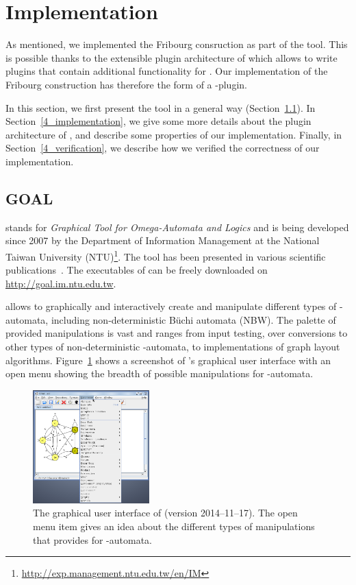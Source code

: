 \section{Implementation}
As mentioned, we implemented the Fribourg consruction as part of the \goal{} tool. This is possible thanks to the extensible plugin architecture of \goal{} which allows to write plugins that contain additional functionality for \goal. Our implementation of the Fribourg construction has therefore the form of a \goal-plugin.

In this section, we first present the \goal{} tool in a general way (Section~\ref{4_goal}). In Section~\ref{4_implementation}, we give some more details about the plugin architecture of \goal, and describe some properties of our implementation. Finally, in Section~\ref{4_verification}, we describe how we verified the correctness of our implementation.


\subsection{GOAL}
\label{4_goal}
\goal{} stands for \textit{Graphical Tool for Omega-Automata and Logics} and is being developed since 2007 by the Department of Information Management at the National Taiwan University (NTU)\footnote{\url{http://exp.management.ntu.edu.tw/en/IM}}. The tool has been presented in various scientific publications~\cite{2007_goal}\cite{2008_goal_ext}\cite{2009_goal}\cite{2013_goal}. The executables of \goal{} can be freely downloaded on \url{http://goal.im.ntu.edu.tw}.

\goal{} allows to graphically and interactively create and manipulate different types of \om-automata, including non-deterministic Büchi automata (NBW). The palette of provided manipulations is vast and ranges from input testing, over conversions to other types of non-deterministic \om-automata, to implementations of graph layout algorithms. Figure~\ref{goal_gui} shows a screenshot of \goal's graphical user interface with an open menu showing the breadth of possible manipulations for \om-automata. 

\begin{figure}[htb!]
\centering
\includegraphics[width=0.4\textwidth]{figures/goal.png}
\caption{The graphical user interface of \goal{} (version 2014--11--17). The open menu item gives an idea about the different types of manipulations that \goal{} provides for \om-automata.}
\label{goal_gui}
\end{figure}

